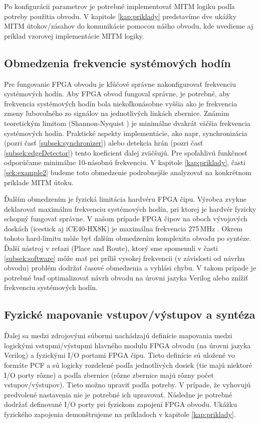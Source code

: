 Po konfigurácii parametrov je potrebné implementovať MITM logiku podľa potreby použitia obvodu. V kapitole \ref{kap:priklady} predstavíme dve ukážky MITM útokov/zásahov do komunikácie pomocou nášho obvodu, kde uvedieme aj príklad vzorovej implementácie MITM logiky.

\subsection{Obmedzenia frekvencie systémových hodín} \label{subsek:sysFreq}
Pre fungovanie FPGA obvodu je kľúčové správne nakonfigurovať frekvenciu systémových hodín. Aby FPGA obvod fungoval správne, je potrebné, aby frekvencia systémových hodín bola niekoľkonásobne vyššia ako je frekvencia zmeny ľubovoľného zo signálov na jednotlivých linkách zbernice. Známim teoretickým limitom (Shannon-Nyquist \cite{shannonNyquist}) je minimálne dvakrát väčšia frekvencia systémových hodín. Praktické aspekty implementácie, ako napr, synchronizácia (pozri časť \ref{subsek:synchronizer}) alebo detekcia hrán (pozri časť \ref{subsek:edgeDetector}) tento koeficient ďalej zväčšujú. Pre spoľahlivú funkčnosť odporúčame minimálne 10-násobnú frekvenciu. V kapitole \ref{kap:priklady}, časti \ref{sek:example2} budeme toto obmedzenie podrobnejšie analyzovať na konkrétnom príklade MITM útoku.

Ďalším obmedzením je fyzická limitácia hardvéru FPGA čipu. Výrobca zvykne deklarovať maximálnu frekvenciu systémových hodín, pri ktorej je hardvér fyzicky schopný fungovať správne. V našom prípade FPGA čipov na oboch vývojových doskách (icestick aj iCE40-HX8K) je maximálna frekvencia 275\,MHz \cite{lphxFamily}. Okrem tohoto hard-limitu môže byť ďalším obmedzením komplexita obvodu po syntéze. Ďalší nástroj v reťazi (Place and Route), ktorý sme spomenuli v časti \ref{subsek:software} môže mať pri príliš vysokej frekvencii (v závislosti od návrhu obvodu) problém dodržať časové obmedzenia a vyhlási chybu. V takom prípade je potrebné buď optimalizovať návrh obvodu na úrovni jazyka Verilog alebo znížiť frekvenciu systémových hodín.

\subsection{Fyzické mapovanie vstupov/výstupov a syntéza}
Ďalej sa medzi zdrojovými súbormi nachádzajú definície mapovania medzi logickými vstupmi/výstupmi hlavného modulu FPGA obvodu (na úrovni jazyka Verilog) a fyzickými I/O portami FPGA čipu. Tieto definície sú uložené vo formáte PCF a sú logicky rozdelené podľa jednotlivých dosiek (tie majú niektoré I/O porty rôzne) a podľa zbernice (rôzne zbernice majú rôzny počet vstupov/výstupov). Tieto možno upraviť podľa potreby. V prípade, že vyhovujú predvolené nastavenia nie je potrebné ich upravovať. Následne je potrebné dodržať definované I/O porty pri fyzickom zapojení FPGA obvodu. Ukážku fyzického zapojenia demonštrujeme na príkladoch v kapitole \ref{kap:priklady}. 

